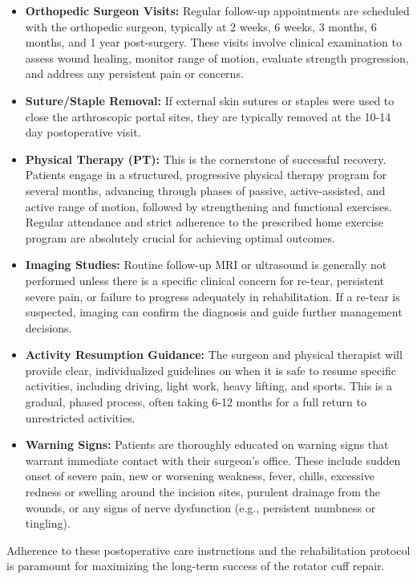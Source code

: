 \begin{itemize}
  \item \textbf{Orthopedic Surgeon Visits:} Regular follow-up appointments are scheduled with the orthopedic surgeon, typically at 2 weeks, 6 weeks, 3 months, 6 months, and 1 year post-surgery. These visits involve clinical examination to assess wound healing, monitor range of motion, evaluate strength progression, and address any persistent pain or concerns.
  \item \textbf{Suture/Staple Removal:} If external skin sutures or staples were used to close the arthroscopic portal sites, they are typically removed at the 10-14 day postoperative visit.
  \item \textbf{Physical Therapy (PT):} This is the cornerstone of successful recovery. Patients engage in a structured, progressive physical therapy program for several months, advancing through phases of passive, active-assisted, and active range of motion, followed by strengthening and functional exercises. Regular attendance and strict adherence to the prescribed home exercise program are absolutely crucial for achieving optimal outcomes.
  \item \textbf{Imaging Studies:} Routine follow-up MRI or ultrasound is generally not performed unless there is a specific clinical concern for re-tear, persistent severe pain, or failure to progress adequately in rehabilitation. If a re-tear is suspected, imaging can confirm the diagnosis and guide further management decisions.
  \item \textbf{Activity Resumption Guidance:} The surgeon and physical therapist will provide clear, individualized guidelines on when it is safe to resume specific activities, including driving, light work, heavy lifting, and sports. This is a gradual, phased process, often taking 6-12 months for a full return to unrestricted activities.
  \item \textbf{Warning Signs:} Patients are thoroughly educated on warning signs that warrant immediate contact with their surgeon's office. These include sudden onset of severe pain, new or worsening weakness, fever, chills, excessive redness or swelling around the incision sites, purulent drainage from the wounds, or any signs of nerve dysfunction (e.g., persistent numbness or tingling).
\end{itemize}
Adherence to these postoperative care instructions and the rehabilitation protocol is paramount for maximizing the long-term success of the rotator cuff repair.

